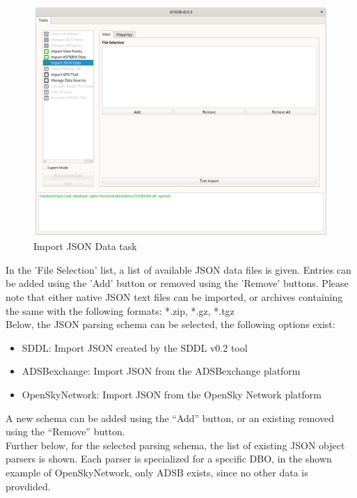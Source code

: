 {\begin{figure}[H]
  \center
    \includegraphics[width=14cm,frame]{../screenshots/import_json_data.png}
  \caption{Import JSON Data task}
\end{figure}

In the 'File Selection' list, a list of available JSON data files is given. Entries can be added using the 'Add' button or removed using the 'Remove' buttons. Please note that either native JSON text files can be imported, or archives containing the same with the following formats: *.zip, *.gz, *.tgz \\

Below, the JSON parsing schema can be selected, the following options exist:
\begin{itemize}  
\item SDDL: Import JSON created by the SDDL v0.2 tool
\item ADSBexchange: Import JSON from the ADSBexchange platform
\item OpenSkyNetwork: Import JSON from the OpenSky Network platform
\end{itemize}

A new schema can be added using the ``Add'' button, or an existing removed using the ``Remove'' button. \\

Further below, for the selected parsing schema, the list of existing JSON object parsers is shown. Each parser is specialized for a specific DBO, in the shown example of OpenSkyNetwork, only ADSB exists, since no other data is provdided. \\

}
